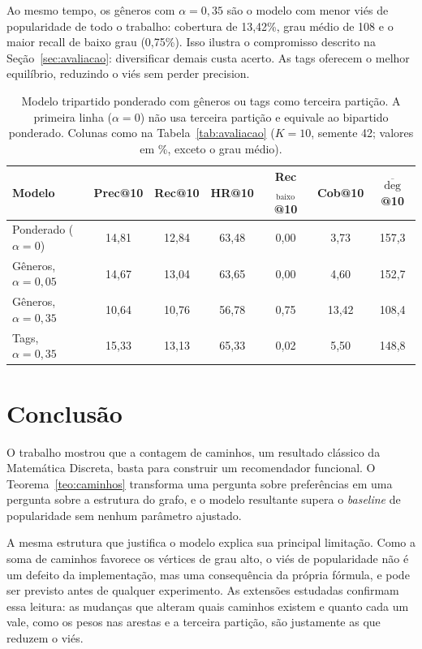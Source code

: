 \documentclass[12pt,a4paper]{article}
\theoremstyle{definition}
\begin{document}
Ao mesmo tempo, os gêneros com $\alpha = 0{,}35$ são o modelo com menor
viés de popularidade de todo o trabalho: cobertura de 13{,}42\%, grau
médio de 108 e o maior recall de baixo grau (0{,}75\%). Isso ilustra o
compromisso descrito na Seção~\ref{sec:avaliacao}: diversificar demais
custa acerto. As tags oferecem o melhor equilíbrio, reduzindo o viés sem
perder precision.

\begin{table}[ht]
\centering
\small
\begin{tabular}{lcccccc}
\toprule
Modelo & Prec@10 & Rec@10 & HR@10 & Rec$_{\text{baixo}}$@10 & Cob@10 & $\overline{\deg}$@10 \\
\midrule
Ponderado ($\alpha = 0$)            & 14{,}81 & 12{,}84 & 63{,}48 & 0{,}00 & 3{,}73 & 157{,}3 \\
Gêneros, $\alpha = 0{,}05$          & 14{,}67 & 13{,}04 & 63{,}65 & 0{,}00 & 4{,}60 & 152{,}7 \\
Gêneros, $\alpha = 0{,}35$          & 10{,}64 & 10{,}76 & 56{,}78 & 0{,}75 & 13{,}42 & 108{,}4 \\
Tags, $\alpha = 0{,}35$             & 15{,}33 & 13{,}13 & 65{,}33 & 0{,}02 & 5{,}50 & 148{,}8 \\
\bottomrule
\end{tabular}
\caption{Modelo tripartido ponderado com gêneros ou tags como terceira
partição. A primeira linha ($\alpha = 0$) não usa terceira partição e
equivale ao bipartido ponderado. Colunas como na
Tabela~\ref{tab:avaliacao} ($K = 10$, semente 42; valores em \%, exceto
o grau médio).}
\label{tab:tags-generos}
\end{table}

\section{Conclusão}\label{sec:conclusao}

O trabalho mostrou que a contagem de caminhos, um resultado clássico da
Matemática Discreta, basta para construir um recomendador funcional. O
Teorema~\ref{teo:caminhos} transforma uma pergunta sobre preferências em
uma pergunta sobre a estrutura do grafo, e o modelo resultante supera o
\emph{baseline} de popularidade sem nenhum parâmetro ajustado.

A mesma estrutura que justifica o modelo explica sua principal
limitação. Como a soma de caminhos favorece os vértices de grau alto, o
viés de popularidade não é um defeito da implementação, mas uma
consequência da própria fórmula, e pode ser previsto antes de qualquer
experimento. As extensões estudadas confirmam essa leitura: as mudanças
que alteram quais caminhos existem e quanto cada um vale, como os pesos
nas arestas e a terceira partição, são justamente as que reduzem o viés.
\end{document}

